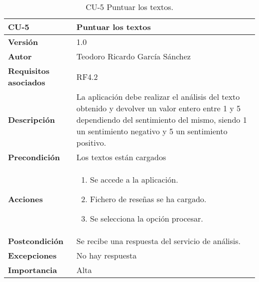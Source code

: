 \begin{table}[p]
	\centering
	\begin{tabularx}{\linewidth}{ p{} p{} }
		\toprule
		\textbf{CU-5}    & \textbf{Puntuar los textos}\\
		\toprule
		\textbf{Versión}              & 1.0    \\
		\textbf{Autor}                & Teodoro Ricardo García Sánchez \\
		\textbf{Requisitos asociados} & RF4.2 \\
		\textbf{Descripción}          & La aplicación debe realizar el análisis del texto obtenido
										 y devolver un valor entero entre 1 y 5 dependiendo del sentimiento del mismo, siendo 1 un sentimiento negativo y 5 un sentimiento positivo. \\
		\textbf{Precondición}         & Los textos están cargados \\
		\textbf{Acciones}             &
		\begin{enumerate}
			\def\labelenumi{\arabic{enumi}.}
			\tightlist
			\item Se accede a la aplicación.
			\item Fichero de reseñas se ha cargado.
			\item Se selecciona la opción procesar.
		\end{enumerate}\\
		\textbf{Postcondición}        & Se recibe una respuesta del servicio de análisis.\\
		\textbf{Excepciones}          & No hay respuesta \\
		\textbf{Importancia}          & Alta \\
		\bottomrule
	\end{tabularx}
	\caption{CU-5 Puntuar los textos.}
\end{table}
